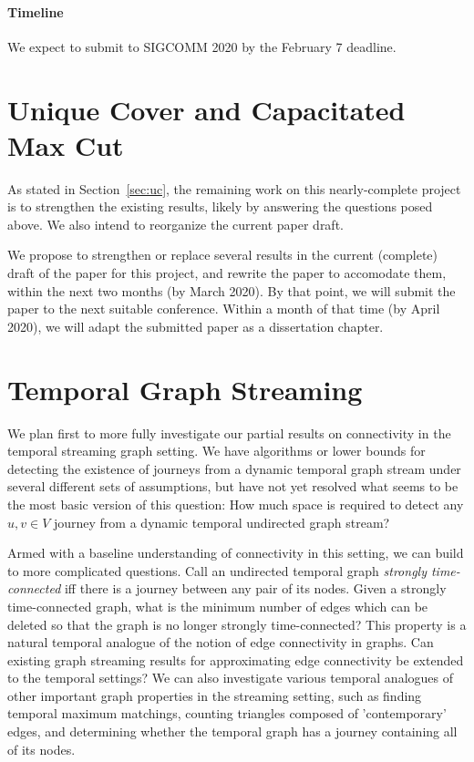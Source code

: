 \paragraph*{Timeline}
We expect to submit to SIGCOMM 2020 by the February 7 deadline.

\section{Unique Cover and Capacitated Max Cut}
As stated in Section~\ref{sec:uc}, the remaining work on this nearly-complete project is to strengthen the existing results, likely by answering the questions posed above.  We also intend to reorganize the current paper draft.

We propose to strengthen or replace several results in the current (complete) draft of the paper for this project, and rewrite the paper to accomodate them, within the next two months (by March 2020).  By that point, we will submit the paper to the next suitable conference.  Within a month of that time (by April 2020), we will adapt the submitted paper as a dissertation chapter.

\section{Temporal Graph Streaming}
We plan first to more fully investigate our partial results on connectivity in the temporal streaming graph setting.  We have algorithms or lower bounds for detecting the existence of journeys from a dynamic temporal graph stream under several different sets of assumptions, but have not yet resolved what seems to be the most basic version of this question: How much space is required to detect any $u,v \in V$ journey from a dynamic temporal undirected graph stream?

Armed with a baseline understanding of connectivity in this setting, we can build to more complicated questions.  Call an undirected temporal graph \emph{strongly time-connected} iff there is a journey between any pair of its nodes.  Given a strongly time-connected graph, what is the minimum number of edges which can be deleted so that the graph is no longer strongly time-connected?  This property is a natural temporal analogue of the notion of edge connectivity in graphs.  Can existing graph streaming results for approximating edge connectivity be extended to the temporal settings?  We can also investigate various temporal analogues of other important graph properties in the streaming setting, such as finding temporal maximum matchings, counting triangles composed of 'contemporary' edges, and determining whether the temporal graph has a journey containing all of its nodes.

